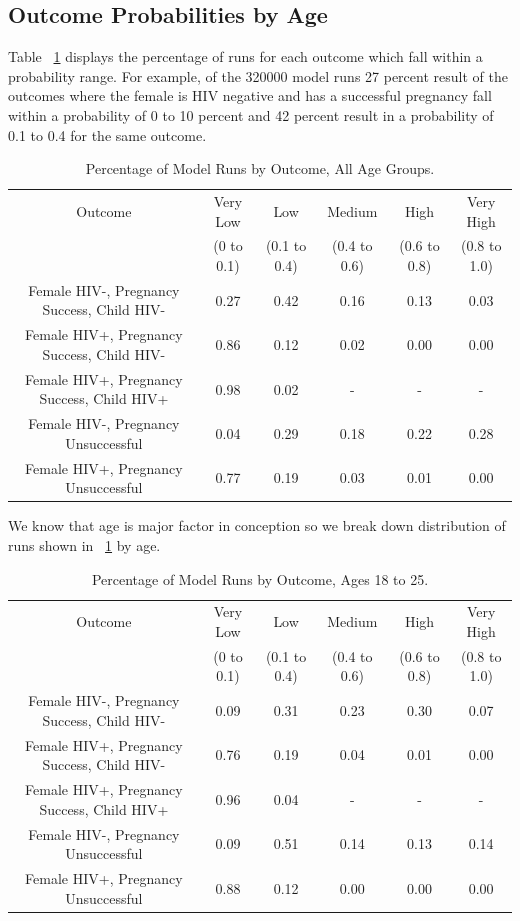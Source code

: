 \documentclass[11pt]{nih_mod}
\begin{document}
\subsection{Outcome Probabilities by Age}
Table ~\ref{tab:outcomefreqs}  displays the percentage of runs for each outcome which fall within a probability range.  For example, of the 320000 model runs 27 percent result of the outcomes where the female is HIV negative and has a successful pregnancy fall within a probability of 0 to 10 percent and 42 percent result in a probability of 0.1 to 0.4 for the same outcome.  
\begin{table}	
\begin{center}
\begin{tabular}{|c|c|c|c|c|c|}
\hline
Outcome & Very Low& Low & Medium& High& Very High\\
 & (0 to 0.1) & (0.1 to 0.4) & (0.4 to 0.6) & (0.6 to 0.8) & (0.8 to 1.0)\\
\hline
\hline
Female HIV-, Pregnancy Success, Child HIV- & 0.27& 0.42 & 0.16 & 0.13 & 0.03\\
Female HIV+, Pregnancy Success, Child HIV- & 0.86 & 0.12 & 0.02 & 0.00 & 0.00\\
Female HIV+, Pregnancy Success, Child HIV+ & 0.98 & 0.02 & - & - &- \\
Female HIV-, Pregnancy Unsuccessful & 0.04 & 0.29 & 0.18 & 0.22 & 0.28 \\
Female HIV+, Pregnancy Unsuccessful & 0.77 & 0.19 & 0.03 & 0.01 & 0.00\\
\hline
\end{tabular}
	\caption{Percentage of Model Runs by Outcome, All Age Groups. \label{tab:outcomefreqs}}
\end{center}
\end{table} 

We know that age is major factor in conception so we break down distribution of runs shown in ~\ref{tab:outcomefreqs} by age.

\begin{table}	
\begin{center}
\begin{tabular}{|c|c|c|c|c|c|}
\hline
Outcome & Very Low& Low & Medium& High& Very High\\
 & (0 to 0.1) & (0.1 to 0.4) & (0.4 to 0.6) & (0.6 to 0.8) & (0.8 to 1.0)\\
\hline
\hline
Female HIV-, Pregnancy Success, Child HIV- & 0.09& 0.31 & 0.23 & 0.30 & 0.07\\
Female HIV+, Pregnancy Success, Child HIV- & 0.76 & 0.19 & 0.04 & 0.01 & 0.00\\
Female HIV+, Pregnancy Success, Child HIV+ & 0.96 & 0.04 & - & - &- \\
Female HIV-, Pregnancy Unsuccessful & 0.09 & 0.51 & 0.14 & 0.13 & 0.14 \\
Female HIV+, Pregnancy Unsuccessful & 0.88 & 0.12 & 0.00 & 0.00 & 0.00\\
\hline
\end{tabular}
	\caption{Percentage of Model Runs by Outcome, Ages 18 to 25. \label{tab:outcomefreqs18}}
\end{center}
\end{table} 
\end{document}
